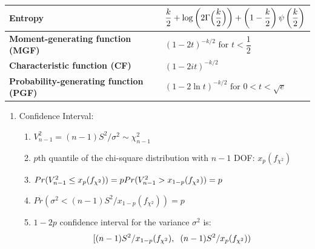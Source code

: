 \begin{customTableWrapper}{2}
\begin{longtable}{|m{6cm}|p{9cm}|}
    \textbf{Entropy} &
    ${\displaystyle {{\dfrac {k}{2}} +\log \left(2\Gamma {\Bigl (}{\dfrac {k}{2}}{\Bigr )}\right)+\left(1-{\dfrac {k}{2}}\right)\psi \left({\dfrac {k}{2}}\right)}}$
    \\[1ex] \hline

    \textbf{Moment-generating function (MGF)} &
    ${\displaystyle (1-2t)^{-k/2}{\text{ for }}t<{\dfrac {1}{2}}\;}$
    \\[1ex] \hline

    \textbf{Characteristic function (CF)} &
    ${\displaystyle (1-2it)^{-k/2}}$
    \\[1ex] \hline

    \textbf{Probability-generating function (PGF)} &
    ${\displaystyle (1-2\ln t)^{-k/2}{\text{ for }}0<t<{\sqrt {e}}\;}$
    \\[1ex] \hline

\end{longtable}
\end{customTableWrapper}

\begin{enumerate}[itemsep=0.2cm]
    \item Confidence Interval:
    \begin{enumerate}[itemsep=0.2cm]
        \item $V_{n-1}^2 = (n-1)S^2/\sigma^2 \sim \chi_{n-1}^2$

        \item $p$th quantile of the chi-square distribution with $n - 1$ DOF: $x_p(f_{\chi^2})$

        \item $
            \hfill
            Pr(V_{n-1}^2 \leq x_p(f_{\chi^2})) = p
            \hfill
            Pr(V_{n-1}^2 > x_{1-p}(f_{\chi^2})) = p
            \hfill
        $

        \item $
            Pr(\sigma^2 < (n-1)S^2/x_{1-p}(f_{\chi^2})) = p 
        $

        \item $1 - 2p$ confidence interval for the variance $\sigma^2$ is:
        \[[
            (n-1)S^2/x_{1-p}(f_{\chi^2}), 
            \hspace{0.2cm}
            (n-1)S^2/x_{p}(f_{\chi^2})
        )\]

    \end{enumerate}

\end{enumerate}




